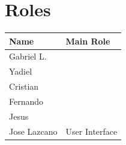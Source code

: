 \documentclass{article}
\begin{document}
\section{Roles}
\vspace{10}
\begin{center}

\begin{tabular}{| l | p{5cm} |}\hline
Name & Main Role \\ \hline
Gabriel L. & \\ \hline
Yadiel     & \\ \hline
Cristian   & \\ \hline
Fernando   & \\ \hline
Jesus	   & \\ \hline
Jose Lazcano  & User Interface\\ \hline
\end{tabular}

\end{center}
\end{document}
